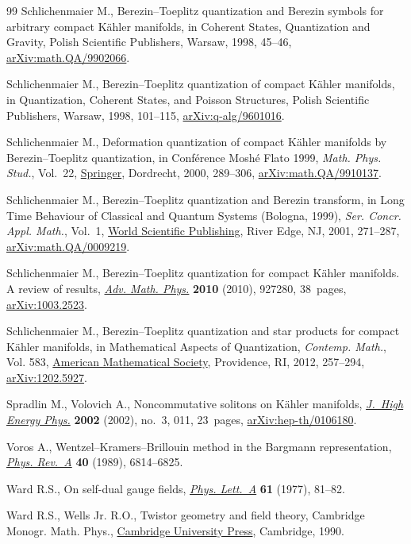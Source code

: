 \begin{thebibliography}{99}
Schlichenmaier M., Berezin--{T}oeplitz quantization and Berezin symbols for
 arbitrary compact K\"{a}hler manifolds, in Coherent {S}tates, {Q}uantization
 and {G}ravity, Polish Scientific Publishers, Warsaw, 1998, 45--46,
 \href{http://arxiv.org/abs/math.QA/9902066}{arXiv:math.QA/9902066}.

Schlichenmaier M., Berezin--{T}oeplitz quantization of compact {K}\"ahler
 manifolds, in Quantization, {C}oherent {S}tates, and {P}oisson {S}tructures,
 Polish Scientific Publishers, Warsaw, 1998, 101--115,
 \href{http://arxiv.org/abs/q-alg/9601016}{arXiv:q-alg/9601016}.

Schlichenmaier M., Deformation quantization of compact {K}\"ahler manifolds by
 {B}erezin--{T}oeplitz quantization, in Conf\'{e}rence Mosh\'{e} Flato 1999,
 \textit{Math. Phys. Stud.}, Vol.~22,
 \href{https://doi.org/10.1007/978-94-015-1276-3_22}{Springer}, Dordrecht,
 2000, 289--306,
 \href{http://arxiv.org/abs/math.QA/9910137}{arXiv:math.QA/9910137}.

Schlichenmaier M., Berezin--{T}oeplitz quantization and {B}erezin transform, in
 Long {T}ime {B}ehaviour of {C}lassical and {Q}uantum {S}ystems ({B}ologna,
 1999), \textit{Ser. Concr. Appl. Math.}, Vol.~1,
 \href{https://doi.org/10.1142/9789812794598_0015}{World Scientific
 Publishing}, River Edge, NJ, 2001, 271--287,
 \href{http://arxiv.org/abs/math.QA/0009219}{arXiv:math.QA/0009219}.

Schlichenmaier M., Berezin--{T}oeplitz quantization for compact {K}\"ahler
 manifolds. {A} review of results,
 \href{https://doi.org/10.1155/2010/927280}{\textit{Adv. Math. Phys.}}
 \textbf{2010} (2010), 927280, 38~pages,
 \href{http://arxiv.org/abs/1003.2523}{arXiv:1003.2523}.

Schlichenmaier M., Berezin--{T}oeplitz quantization and star products for
 compact {K}\"ahler manifolds, in Mathematical {A}spects of {Q}uantization,
 \textit{Contemp. Math.}, Vol. 583,
 \href{https://doi.org/10.1090/conm/583/11573}{American Mathematical Society},
 Providence, RI, 2012, 257--294,
 \href{http://arxiv.org/abs/1202.5927}{arXiv:1202.5927}.

Spradlin M., Volovich A., Noncommutative solitons on {K}\"ahler manifolds,
 \href{https://doi.org/10.1088/1126-6708/2002/03/011}{\textit{J.~High Energy
 Phys.}} \textbf{2002} (2002), no.~3, 011, 23~pages,
 \href{http://arxiv.org/abs/hep-th/0106180}{arXiv:hep-th/0106180}.

Voros A., Wentzel--{K}ramers--{B}rillouin method in the {B}argmann
 representation, \href{https://doi.org/10.1103/PhysRevA.40.6814}{\textit{Phys.
 Rev.~A}} \textbf{40} (1989), 6814--6825.

Ward R.S., On self-dual gauge fields,
 \href{https://doi.org/10.1016/0375-9601(77)90842-8}{\textit{Phys. Lett.~A}}
 \textbf{61} (1977), 81--82.

Ward R.S., Wells Jr. R.O., Twistor geometry and field theory, Cambridge Monogr.
 Math. Phys., \href{https://doi.org/10.1017/CBO9780511524493}{Cambridge
 University Press}, Cambridge, 1990.

\end{thebibliography}
